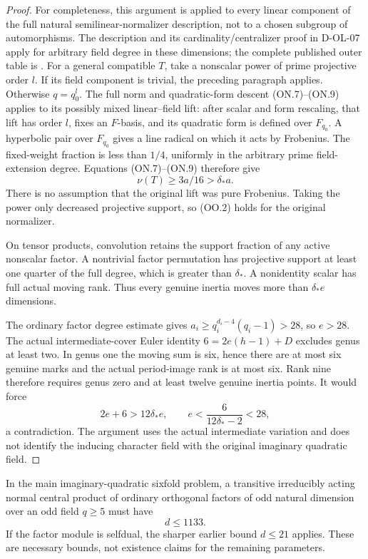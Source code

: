 \begin{proof}
For completeness, this argument is applied to every linear
component of the full natural semilinear-normalizer description,
not to a chosen subgroup of automorphisms.  The description and
its cardinality/centralizer proof in D-OL-07 apply for arbitrary
field degree in these dimensions; the complete published outer
table is \cite[Section~2.2.2, Table~2.1, p.~14]{HES:LiXia2022}.
For a general compatible $T$, take a nonscalar power of prime
projective order $l$.  If its field component is trivial, the
preceding paragraph applies.  Otherwise $q=q_0^l$.  The full
norm and quadratic-form descent (ON.7)--(ON.9) applies to its
possibly mixed linear--field lift: after scalar and form
rescaling, that lift has order $l$, fixes an $F$-basis, and its
quadratic form is defined over $F_{q_0}$.  A hyperbolic pair over
$F_{q_0}$ gives a line radical on which it acts by Frobenius.
The fixed-weight fraction is less than $1/4$, uniformly in
the arbitrary prime field-extension degree.  Equations
(ON.7)--(ON.9) therefore give
\[
                         \nu(T)\ge3a/16>\delta_*a.          \tag{OO.12}
\]
There is no assumption that the original lift was pure Frobenius.
Taking the power only decreased projective support, so (OO.2)
holds for the original normalizer.

On tensor products, convolution retains the support fraction
of any active nonscalar factor.  A nontrivial factor permutation
has projective support at least one quarter of the full degree,
which is greater than $\delta_*$.  A nonidentity scalar has full
actual moving rank.  Thus every genuine inertia moves more than
$\delta_*e$ dimensions.

The ordinary factor degree estimate
\cite[Theorem~3.7, pp.~165--167]{OL:GLT2024} gives
$a_i\ge q_i^{d_i-4}(q_i-1)>28$, so $e>28$.
The actual intermediate-cover Euler identity
$6=2e(h-1)+D$ excludes genus at least two.  In genus one the
moving sum is six, hence there are at most six genuine marks
and the actual period-image rank is at most six.  Rank nine
therefore requires genus zero and at least twelve genuine
inertia points.  It would force
\[
             2e+6>12\delta_*e,
             \qquad e<\frac6{12\delta_*-2}<28,              \tag{OO.13}
\]
a contradiction.  The argument uses the actual intermediate
variation and does not identify the inducing character field
with the original imaginary quadratic field.
\end{proof}

\begin{corollary}[D-OL-13]
\label{D-OL-13}
In the main imaginary-quadratic sixfold problem, a transitive
irreducibly acting normal central product of ordinary orthogonal
factors of odd natural dimension over an odd field $q\ge5$
must have
\[
                              d\le1133.                    \tag{OO.14}
\]
If the factor module is selfdual, the sharper earlier bound
$d\le21$ applies.  These are necessary bounds, not existence
claims for the remaining parameters.
\end{corollary}

